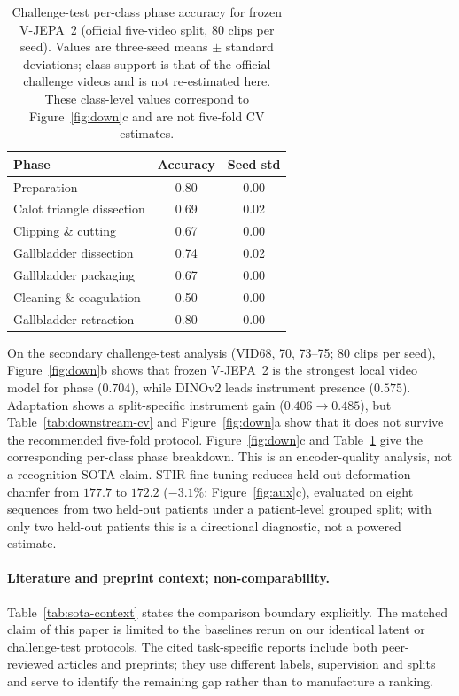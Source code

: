 \documentclass[preprint,12pt]{elsarticle}
\begin{document}
\begin{table}[t]
\centering
\caption{Challenge-test per-class phase accuracy for frozen V-JEPA~2
(official five-video split, 80 clips per seed). Values are three-seed means
$\pm$ standard deviations; class support is that of the official challenge
videos and is not re-estimated here. These class-level values
correspond to Figure~\ref{fig:down}c and are not five-fold CV estimates.}
\label{tab:perclass}
\small
\begin{tabular}{lcc}
\toprule
Phase & Accuracy & Seed std \\
\midrule
Preparation & 0.80 & 0.00 \\
Calot triangle dissection & 0.69 & 0.02 \\
Clipping \& cutting & 0.67 & 0.00 \\
Gallbladder dissection & 0.74 & 0.02 \\
Gallbladder packaging & 0.67 & 0.00 \\
Cleaning \& coagulation & 0.50 & 0.00 \\
Gallbladder retraction & 0.80 & 0.00 \\
\bottomrule
\end{tabular}
\end{table}

On the secondary challenge-test analysis (VID68, 70, 73--75; 80 clips per
seed), Figure~\ref{fig:down}b shows that frozen
V-JEPA~2 is the strongest local video model for phase ($0.704$), while DINOv2
leads instrument presence ($0.575$). Adaptation shows a split-specific
instrument gain ($0.406\to0.485$), but Table~\ref{tab:downstream-cv} and
Figure~\ref{fig:down}a show that
it does not survive the recommended five-fold protocol. Figure~\ref{fig:down}c
and Table~\ref{tab:perclass} give the corresponding per-class phase breakdown.
This is an encoder-quality analysis, not a recognition-SOTA claim.
STIR fine-tuning reduces held-out deformation chamfer from $177.7$ to $172.2$ ($-3.1\%$; Figure~\ref{fig:aux}c), evaluated on eight sequences from two held-out patients under a patient-level grouped split; with only two held-out patients this is a directional diagnostic, not a powered estimate.

\paragraph{Literature and preprint context; non-comparability.}
Table~\ref{tab:sota-context} states the comparison boundary explicitly.
The matched claim of this paper is limited to the baselines rerun on our
identical latent or challenge-test protocols. The cited task-specific reports
include both peer-reviewed articles and preprints; they use different labels,
supervision and splits and serve to identify the remaining gap rather than to
manufacture a ranking.
\end{document}

